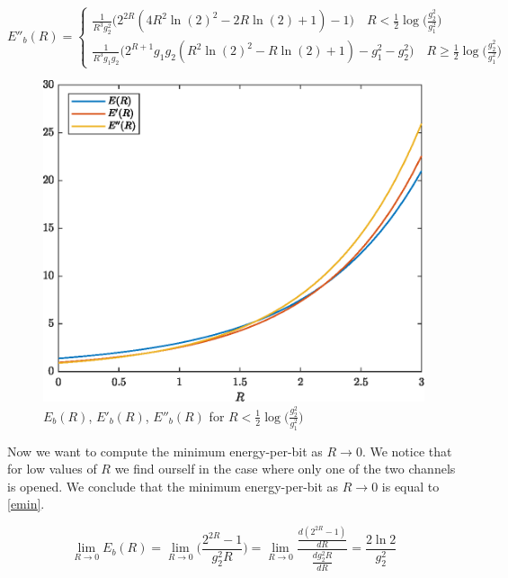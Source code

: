 \begin{equation}
	E''_b(R)= \begin{cases}
		\frac{1}{R^3g_2^2} \Big(2^{2R}(4R^2\ln(2)^2 -2R \ln(2)+1)-1\Big)  \quad R < \frac{1}{2} \log\Big(\frac{g_2^2}{g_1^2}\Big) \\
		\frac{1}{R^3 g_1 g_2} \Big( 2^{R+1} g_1 g_2 ( R^2 \ln(2)^2 - R \ln(2) +1 ) -g_1^2 -g_2^2 \Big) \quad R \geq \frac{1}{2} \log\Big(\frac{g_2^2}{g_1^2}\Big)

\end{cases}
\end{equation}

\begin{figure}[h!]
	\centering
	\includegraphics[width=0.7\linewidth]{img/energy_per_bit_1.eps}
	\caption{$E_b(R)$, $E'_b(R)$, $E''_b(R)$ for $R < \frac{1}{2} \log\Big(\frac{g_2^2}{g_1^2}\Big)$ }
	\label{fig:funcex2}
\end{figure}


Now we want to compute the minimum energy-per-bit as $R \rightarrow 0$. We notice that for low values of $R$ we find ourself in the case where only one of the two channels is opened. We conclude that the minimum energy-per-bit as $R \rightarrow 0$ is equal to \eqref{emin}.

\begin{equation}
	\lim_{R \rightarrow 0} E_b(R) =
		\lim_{R \rightarrow 0} \Big(\frac{2^{2R}-1}{g_2^2 R}\Big) = \lim_{R \rightarrow 0} \frac{ \frac{d(2^{2R}-1)}{dR}} {\frac{dg_2^2 R}{dR}}=\frac{2\ln{2}}{g_2^2}
		\label{emin}
\end{equation}

